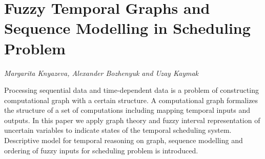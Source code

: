 \documentclass[../booklet.tex]{subfiles}
\begin{document}
\section[Fuzzy Temporal Graphs and Sequence Modelling in  Scheduling Problem. {\it Margarita Knyazeva, Alexander Bozhenyuk and Uzay Kaymak}]{Fuzzy Temporal Graphs and Sequence Modelling in  Scheduling Problem}
  

\begin{center}
  {\it Margarita Knyazeva, Alexander Bozhenyuk and Uzay Kaymak}
\end{center}

\vskip 0.8cm

Processing sequential data and time-dependent data is a problem of constructing computational graph with a certain structure. A computational graph formalizes the structure of a set of computations including mapping temporal inputs and outputs. In this paper we apply graph theory and fuzzy interval representation of uncertain variables to indicate states of the temporal scheduling system. Descriptive model for temporal reasoning on graph, sequence modelling and ordering of fuzzy inputs for scheduling problem is introduced.

\end{document}
